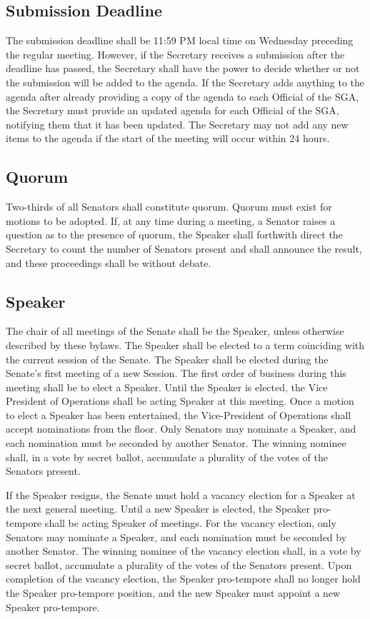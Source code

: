 \documentclass[12pt]{scrreprt}
\begin{document}
\subsection{Submission Deadline}
The submission deadline shall be 11:59 PM local time on Wednesday preceding the regular meeting.
However, if the Secretary receives a submission after the deadline has passed, the Secretary
shall have the power to decide whether or not the submission will be added to the agenda. If the
Secretary adds anything to the agenda after already providing a copy of the agenda to each
Official of the SGA, the Secretary must provide an updated agenda for each Official of the SGA,
notifying them that it has been updated. The Secretary may not add any new items to the
agenda if the start of the meeting will occur within 24 hours.

\subsection{Quorum}
Two-thirds of all Senators shall constitute quorum. Quorum must exist for motions to be
adopted. If, at any time during a meeting, a Senator raises a question as to the presence of quorum, the
Speaker shall forthwith direct the Secretary to count the number of Senators present and shall
announce the result, and these proceedings shall be without debate.
\subsection{Speaker}
The chair of all meetings of the Senate shall be the Speaker, unless otherwise described by
these bylaws. The Speaker shall be elected to a term coinciding with the current session of the
Senate. The Speaker shall be elected during the Senate’s first meeting of a new Session. The
first order of business during this meeting shall be to elect a Speaker. Until the Speaker is
elected, the Vice President of Operations shall be acting Speaker at this meeting. Once a
motion to elect a Speaker has been entertained, the Vice-President of Operations shall accept
nominations from the floor. Only Senators may nominate a Speaker, and each nomination must
be seconded by another Senator. The winning nominee shall, in a vote by secret ballot,
accumulate a plurality of the votes of the Senators present.

If the Speaker resigns, the Senate must hold a vacancy election for a Speaker at the next
general meeting. Until a new Speaker is elected, the Speaker pro-tempore shall be acting
Speaker of meetings. For the vacancy election, only Senators may nominate a Speaker, and
each nomination must be seconded by another Senator. The winning nominee of the vacancy
election shall, in a vote by secret ballot, accumulate a plurality of the votes of the Senators
present. Upon completion of the vacancy election, the Speaker pro-tempore shall no longer hold
the Speaker pro-tempore position, and the new Speaker must appoint a new Speaker
pro-tempore.
\end{document}
